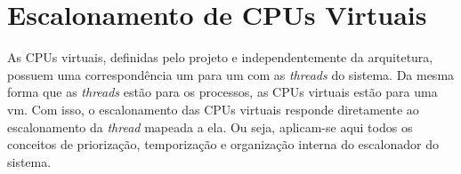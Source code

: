 \section{Escalonamento de CPUs Virtuais}

As CPUs virtuais, definidas pelo projeto e independentemente da arquitetura, possuem uma correspondência um para um com as \textit{threads} do sistema.
Da mesma forma que as \textit{threads} estão para os processos, as CPUs virtuais estão para uma \gls{vm}. Com isso, o escalonamento das CPUs virtuais responde diretamente ao
escalonamento da \textit{thread} mapeada a ela. Ou seja, aplicam-se aqui todos os conceitos de priorização, temporização e organização interna do escalonador do sistema.

